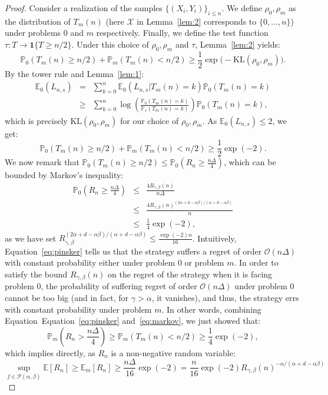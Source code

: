 \documentclass[final,12pt]{colt2018}
\newcommand{\bigO}[1]{\mathcal O\left( #1 \right)}
\begin{document}
\begin{proof}
Consider a realization of the samples $\{(X_i,Y_i)\}_{i\leq n}$. We define $\rho_0, \rho_m$ as the distribution of $T_m(n)$ (here $\mathcal X$ in Lemma~\ref{lem:2} corresponds to $\{0,...,n\}$) under problems $0$ and $m$ respectively. Finally, we define the test function $\tau: T \rightarrow \mathbf 1\{T \geq n/2\}$. Under this choice of $\rho_0, \rho_m$ and $\tau$, Lemma~\ref{lem:2} yields:
$$
\mathbb P_{0}(T_m(n) \geq n/2) + \mathbb P_{m}(T_m(n) < n/2) \geq \frac{1}{2} \exp\big(-\text{KL}(\rho_0, \rho_m)\big).
$$
By the tower rule and Lemma~\ref{lem:1}:
\begin{eqnarray*}
\mathbb E_0(L_{n,s}) & = & \sum_{k = 0}^n \mathbb E_0(L_{n,s} | T_m(n) =k ) \mathbb P_0(T_m(n) = k) \\
& \geq & \sum_{k = 0}^n \log \left(\frac{\mathbb P_0(T_m(n)=k)}{\mathbb P_s(T_m(n) = k)}\right) \mathbb P_0(T_m(n) = k),
\end{eqnarray*}
which is precisely $\text{KL}(\rho_0, \rho_m)$ for our choice of $\rho_0, \rho_m$. As $\mathbb E_0(L_{n,s}) \leq 2$, we get:
\begin{equation}\label{eq:pinsker}
\mathbb P_{0}(T_m(n) \geq n/2) + \mathbb P_{m}(T_m(n) < n/2) \geq \frac{1}{2}\exp(-2).
\end{equation}
We now remark that $\mathbb P_{0}(T_m(n) \geq n/2)\leq \mathbb P_{0}(R_n \geq \frac{n\Delta}{4})$, which can be bounded by Markov's inequality:
\begin{eqnarray}\label{eq:markov}
\mathbb P_{0}(R_n \geq \frac{n\Delta}{4}) & \leq & \frac{4R_{\gamma,\beta}(n)}{n\Delta}\\ \nonumber
& \leq & \frac{4R_{\gamma,\beta}(n)^{(2\alpha+d-\alpha\beta)/(\alpha+d-\alpha\beta)}}{n}\\ \nonumber
& \leq & \frac{1}{4}\exp(-2),
\end{eqnarray}
as we have set $R_{\gamma,\beta}^{(2\alpha+d-\alpha\beta)/(\alpha+d-\alpha\beta)} \leq \frac{\exp(-2)n}{16}$. Intuitively, Equation~\eqref{eq:pinsker} tells us that the strategy suffers a regret of order $\bigO{n\Delta}$ with constant probability either under problem $0$ or problem $m$. In order to satisfy the bound $R_{\gamma,\beta}(n)$ on the regret of the strategy when it is facing problem $0$, the probability of suffering regret of order $\bigO{n\Delta}$ under problem $0$ cannot be too big (and in fact, for $\gamma > \alpha$, it vanishes), and thus, the strategy errs with constant probability under problem $m$. In other words, combining Equation~Equation~\eqref{eq:pinsker} and~\eqref{eq:markov}, we just showed that:
$$
\mathbb P_{m}(R_n > \frac{n\Delta}{4})  \geq \mathbb P_{m}(T_m(n) < n/2) \geq \frac{1}{4}\exp(-2),
$$
which implies directly, as $R_n$ is a non-negative random variable:
$$
\sup_{f \in \mathcal P(\alpha,\beta)} \mathbb E[R_n] \geq  \mathbb E_m[R_n] \geq \frac{n\Delta}{16}\exp(-2) = \frac{n}{16}\exp(-2)R_{\gamma,\beta}(n)^{-\alpha/(\alpha+d-\alpha\beta)}
$$
\end{proof}
\end{document}
